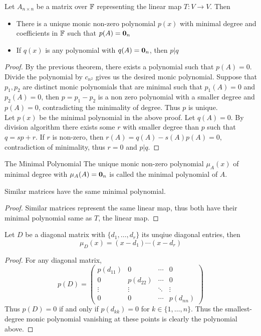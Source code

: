 \documentclass[a4paper]{article}
\begin{document}
\begin{thm}{}{} Let $A_{n\times n}$ be a matrix over $\mathbb{F}$ representing the linear map $T:V\to V$. Then 
\begin{itemize}
\item There is a unique monic non-zero polynomial $p(x)$ with minimal degree and coefficients in $\mathbb{F}$ such that $p(A)=\vb{0}_n$
\item If $q(x)$ is any polynomial with $q(A)=\vb{0}_n$, then $p|q$
\end{itemize}\begin{proof} By the previous theorem, there exists a polynomial such that $p(A)=0$. Divide the polynomial by $c_{n^2}$ gives us the desired monic polynomial. Suppose that $p_1,p_2$ are distinct monic polynomials that are minimal such that $p_1(A)=0$ and $p_2(A)=0$, then $p=p_1-p_2$ is a non zero polynomial with a smaller degree and $p(A)=0$, contradicting the minimality of degree. Thus $p$ is unique. \\
Let $p(x)$ be the minimal polynomial in the above proof. Let $q(A)=0$. By division algorithm there exists some $r$ with smaller degree than $p$ such that $q=sp+r$. If $r$ is non-zero, then $r(A)=q(A)-s(A)p(A)=0$, contradiction of minimality, thus $r=0$ and $p|q$. 
\end{proof}
\end{thm}

\begin{defn}{The Minimal Polynomial}{} The unique monic non-zero polynomial $\mu_A(x)$ of minimal degree with $\mu_A(A)=\vb{0}_n$ is called the minimal polynomial of $A$. 
\end{defn}

\begin{prp}{}{} Similar matrices have the same minimal polynomial. \begin{proof} Similar matrices represent the same linear map, thus both have their minimal polynomial same as $T$, the linear map. 
\end{proof}
\end{prp}

\begin{prp}{}{} Let $D$ be a diagonal matrix with $\{d_1,\dots,d_r\}$ its unqiue diagonal entries, then $$\mu_D(x)=(x-d_1)\cdots(x-d_r)$$
\begin{proof} For any diagonal matrix, $$p(D)=\begin{pmatrix}p(d_{11}) & 0 & \cdots & 0\\ 0 & p(d_{22}) & \cdots & 0 \\ \vdots & \vdots & \ddots & \vdots\\ 0 & 0 & \cdots & p(d_{nn})\end{pmatrix}$$ Thus $p(D)=0$ if and only if $p(d_{kk})=0$ for $k\in\{1,\dots,n\}$. Thus the smallest-degree monic polynomial vanishing at these points is clearly the polynomial above. 
\end{proof}
\end{prp}
\end{document}
